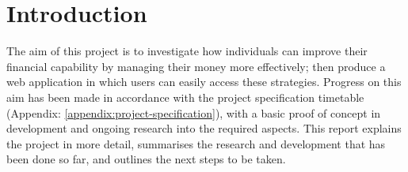 \section{Introduction}

The aim of this project is to investigate how individuals can improve their financial capability by managing their money more effectively; then produce a web application in which users can easily access these strategies. Progress on this aim has been made in accordance with the project specification timetable (Appendix: \ref{appendix:project-specification}), with a basic proof of concept in development and ongoing research into the required aspects. This report explains the project in more detail, summarises the research and development that has been done so far, and outlines the next steps to be taken.
